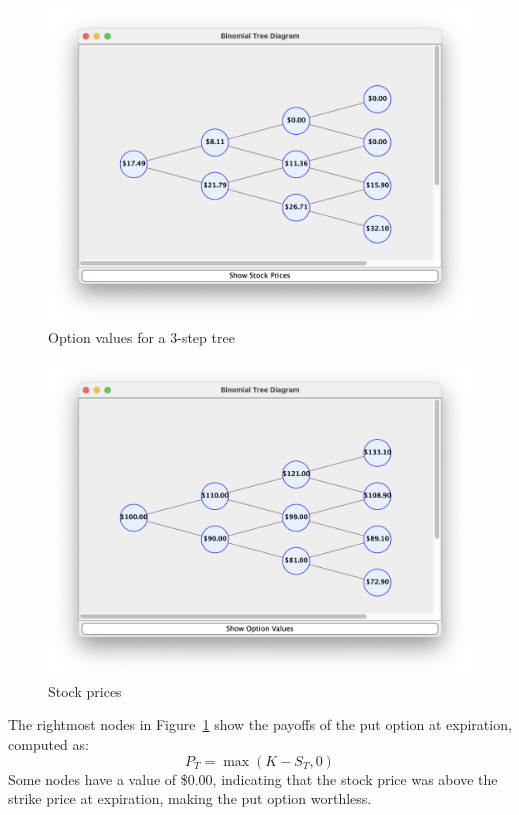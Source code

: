 \documentclass{article}
\begin{document}
    \begin{figure}[H]
        \centering
        \includegraphics[scale=0.4]{Example1_BinTree_OptionValue}
        \caption{Option values for a 3-step tree}
        \label{fig:3_step_option_tree}
    \end{figure}

    \begin{figure}[H]
        \centering
        \includegraphics[scale=0.4]{Example1_BinTree_StockPrice}
        \caption{Stock prices}
        \label{fig:3_step_stock_price_tree}
    \end{figure}

    The rightmost nodes in Figure~\ref{fig:3_step_option_tree} show the payoffs of the put option at expiration, computed as:
    \[
    P_T = \max(K - S_T, 0)
    \]
    Some nodes have a value of \$0.00, indicating that the stock price was above the strike price at expiration, making the put option worthless.
\end{document}
